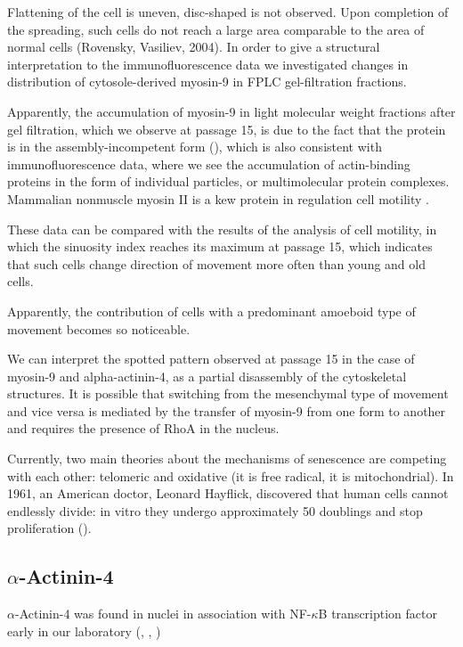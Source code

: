 \documentclass[alpha-refs]{wiley-article}
\begin{document}
Flattening of the cell is uneven, disc-shaped is not observed.
Upon completion of the spreading, such cells do not reach a large area comparable to the area of normal cells (Rovensky, Vasiliev, 2004).
In order to give a structural interpretation to the immunofluorescence data we investigated changes in distribution of cytosole-derived myosin-9 in FPLC gel-filtration fractions.

Apparently, the accumulation of myosin-9 in light molecular weight fractions after gel filtration, which we observe at passage 15, is due to the fact that the protein is in the assembly-incompetent form (\cite{vicente2009non}), which is also consistent with immunofluorescence data, where we see the accumulation of actin-binding proteins in the form of individual particles, or multimolecular protein complexes.
Mammalian nonmuscle myosin II is a kew protein in regulation cell motility \cite{shutova2018mammalian}.

These data can be compared with the results of the analysis of cell motility, in which the sinuosity index reaches its maximum at passage 15, which indicates that such cells change direction of movement more often than young and old cells.

Apparently, the contribution of cells with a predominant amoeboid type of movement becomes so noticeable.

We can interpret the spotted pattern observed at passage 15 in the case of myosin-9 and alpha-actinin-4, as a partial disassembly of the cytoskeletal structures.
It is possible that switching from the mesenchymal type of movement and vice versa is mediated by the transfer of myosin-9 from one form to another and requires the presence of RhoA in the nucleus.

Currently, two main theories about the mechanisms of senescence are competing with each other: telomeric and oxidative (it is free radical, it is mitochondrial). In 1961, an American doctor, Leonard Hayflick, discovered that human cells cannot endlessly divide: in vitro they undergo approximately 50 doublings and stop proliferation (\cite{hayflick1961serial}).



\subsection*{$\alpha$-Actinin-4}

$\alpha$-Actinin-4 was found in nuclei in association with NF-$\kappa$B transcription factor early in our laboratory (\cite{babakov2008rela}, \cite{lomert2018co}, \cite{bolshakova2007extra})
\end{document}
